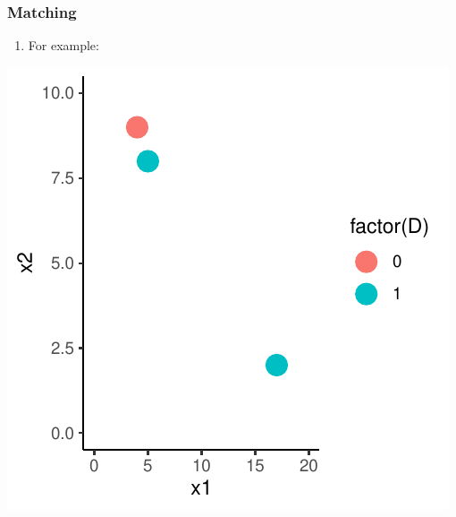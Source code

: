 \documentclass[xcolor=x11names,compress]{beamer}\usepackage[]{graphicx}\usepackage[]{color}
\makeatletter
\def\maxwidth{ %
  \ifdim\Gin@nat@width>\linewidth
    \linewidth
  \else
    \Gin@nat@width
  \fi
}
\newenvironment{knitrout}{}{} %
\renewcommand{\(}{\begin{columns}}
\renewcommand{\)}{\end{columns}}
\newcommand{\<}[1]{\begin{column}{#1}}
\renewcommand{\>}{\end{column}}
\makeatother
\begin{document}
\begin{frame}
\frametitle{Matching}
\begin{enumerate}
\item For example:
\end{enumerate}
\begin{knitrout}
\color{fgcolor}
\includegraphics[width=\maxwidth]{figure/unnamed-chunk-1-1} 

\end{knitrout}
\end{frame}
\end{document}
